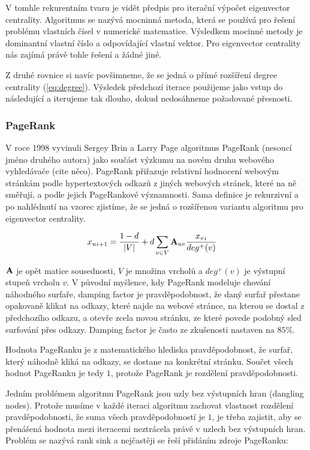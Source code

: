 \documentclass[12pt,titlepage]{report}
\begin{document}
V tomhle rekurentním tvaru je vidět předpis pro iterační výpočet eigenvector
centrality. Algoritmus se nazývá mocninná metoda, která se používá pro řešení
problému vlastních čísel v numerické matematice. Výsledkem mocinné metody je
dominantní vlastní číslo a odpovídající vlastní vektor. Pro eigenvector
centrality nás zajímá právě tohle řešení a žádné jiné.

Z druhé rovnice si navíc povšimneme, že se jedná o přímé rozšíření degree
centrality (\ref{eq:degree}). Výsledek předchozí iterace použijeme jako vstup
do následující a iterujeme tak dlouho, dokud nedosáhneme požadované přesnosti.

\subsubsection{PageRank}
V roce 1998 vyvinuli Sergey Brin a Larry Page algoritmus PageRank (nesoucí
jméno druhého autora) jako součást výzkumu na novém druhu webového vyhledávače
(cite něco). PageRank přiřazuje relativní hodnocení webovým stránkám podle
hypertextových odkazů z jiných webových stránek, které na ně směřují, a podle
jejich PageRankové významnosti. Sama definice je rekurzivní a po nahlédnutí na
vzorec zjistíme, že se jedná o rozšířenou variantu algoritmu pro eigenvector
centrality.

\begin{align}
{x_u}_{i + 1} &= \frac{1 - d}{|V|} + d \displaystyle\sum_{v \in V} {\bf A}_{uv}
\frac{{x_v}_{i}}{deg^+ (v)}
\end{align}

${\bf A}$ je opět matice sousednosti, $V$ je množina vrcholů a $deg^+(v)$ je
výstupní stupeň vrcholu $v$.  V původní myšlence, kdy PageRank modeluje chování
náhodného surfaře, damping factor je pravděpodobnost, že daný surfař přestane
opakovaně klikat na odkazy, které najde na webové stránce, na kterou se dostal
z předchozího odkazu, a otevře zcela novou stránku, ze které povede podobný
sled surfování přes odkazy.  Damping factor je často ze zkušenosti nastaven na
$85\%$.

Hodnota PageRanku je z matematického hlediska pravděpodobnost, že surfař, který
náhodně kliká na odkazy, se dostane na konkrétní stránku. Součet všech hodnot
PageRanku je tedy $1$, protože PageRank je rozdělení pravděpodobnosti.

Jedním problémem algoritmu PageRank jsou uzly bez výstupních hran (dangling
nodes). Protože musíme v každé iteraci algoritmu zachovat vlastnost rozdělení
pravděpodobnosti, že suma všech pravděpodobností je $1$, je třeba zajistit, aby
se přenášená hodnota mezi iteracemi neztrácela právě v uzlech bez výstupních
hran. Problém se nazývá rank sink a nejčastěji se řeší přidáním zdroje
PageRanku:
\end{document}
